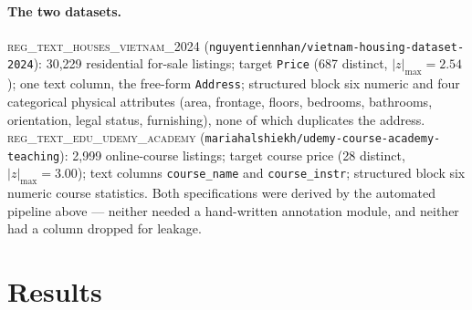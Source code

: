 \documentclass[10pt,letterpaper]{article}
\begin{document}
\paragraph{The two datasets.} \textsc{reg\_text\_houses\_vietnam\_2024}
(\texttt{nguyentiennhan/vietnam-housing-dataset-2024}): 30{,}229 residential for-sale listings;
target \texttt{Price} (687 distinct, $|z|_{\max} = 2.54$); one text column, the free-form
\texttt{Address}; structured block six numeric and four categorical physical attributes (area,
frontage, floors, bedrooms, bathrooms, orientation, legal status, furnishing), none of which
duplicates the address. \textsc{reg\_text\_edu\_udemy\_academy}
(\texttt{mariahalshiekh/udemy-course-academy-teaching}): 2{,}999 online-course listings; target
course price (28 distinct, $|z|_{\max} = 3.00$); text columns \texttt{course\_name} and
\texttt{course\_instr}; structured block six numeric course statistics. Both specifications
were derived by the automated pipeline above --- neither needed a hand-written annotation
module, and neither had a column dropped for leakage.

\section{Results}
\label{sec:results}
\end{document}
